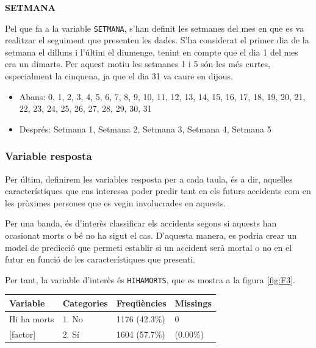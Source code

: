 \documentclass[12pt,longbibliography]{article}
\theoremstyle{definition}
\theoremstyle{remark}
\begin{document}
\textbf{SETMANA}


Pel que fa a la variable \texttt{SETMANA}, s'han definit les setmanes del mes en que es va realitzar el seguiment que presenten les dades. S'ha considerat el primer dia de la setmana el dilluns i l'últim el diumenge, tenint en compte que el dia 1 del mes era un dimarts. Per aquest motiu les setmanes 1 i 5 són les més curtes, especialment la cinquena, ja que el dia 31 va caure en dijous.


\begin{itemize}

\item Abans: 0, 1, 2, 3, 4, 5, 6, 7, 8, 9, 10, 11, 12, 13, 14, 15, 16, 17, 18, 19, 20, 21, 22, 23, 24, 25, 26, 27, 28, 29, 30, 31

\item Després: Setmana 1, Setmana 2, Setmana 3, Setmana 4, Setmana 5

\end{itemize}


\subsubsection{Variable resposta}

Per últim, definirem les variables resposta per a cada taula, és a dir, aquelles característiques que ens interessa poder predir tant en els futurs accidents com en les pròximes persones que es vegin involucrades en aquests.


Per una banda, és d'interès classificar els accidents segons si aquests han ocasionat morts o bé no ha sigut el cas. D'aquesta manera, es podria crear un model de predicció que permeti establir si un accident serà mortal o no en el futur en funció de les característiques que presenti.


Per tant, la variable d'interès és \texttt{HIHAMORTS}, que es mostra a la figura \ref{fig:F3}.

\begin{table}[H]
\centering
\begin{tabular}{llll}
\hline
Variable         & Categories  & Freqüències   & Missings \\ \hline
Hi ha morts & 1. No & 1176 (42.3\%) & 0        \\
{[}factor{]}     & 2. Sí      & 1604 (57.7\%) & (0.00\%) \\ \hline
\end{tabular}
\end{table}
\end{document}
